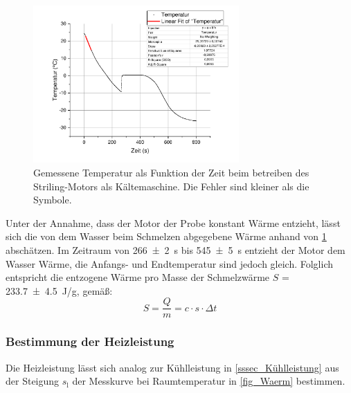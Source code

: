 \documentclass[
	a4paper,
	12pt,
	pagesize,
	ngerman
]{scrartcl}
\begin{document}
	\begin{figure}[H]
		\includegraphics[width=0.7\textwidth]{Kuehl}
		\centering
		\caption{Gemessene Temperatur als Funktion der Zeit beim betreiben des Striling-Motors als Kältemaschine. Die Fehler sind kleiner als die Symbole.}
		\label{fig_Kuehl}
		\centering
	\end{figure}

	Unter der Annahme, dass der Motor der Probe konstant Wärme entzieht, lässt sich die von dem Wasser beim Schmelzen abgegebene Wärme anhand von \cref{fig_Kuehl} abschätzen.
	Im Zeitraum von \SI{266+-2}{s} bis \SI{545+-5}{s} entzieht der Motor dem Wasser Wärme, die Anfangs- und Endtemperatur sind jedoch gleich. 
	Folglich entspricht die entzogene Wärme pro Masse der Schmelzwärme $S$ = \SI{233,7+-4.5}{J/g}, gemäß:
	\begin{equation}
	S = \frac{Q}{m} = c \cdot s\cdot \Delta{t}
	\end{equation}
	
	
	
	\subsubsection{Bestimmung der Heizleistung}
	Die Heizleistung lässt sich analog zur Kühlleistung in \cref{sssec_Kühlleistung} aus der Steigung $s_\text{l}$ der Messkurve bei Raumtemperatur in \cref{fig_Waerm} bestimmen.
	
\end{document}
